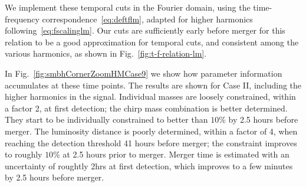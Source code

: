 \documentclass[aps,showpacs,twocolumn,prd,superscriptaddress,nofootinbib]{revtex4-1}
\newcommand{\SM}[1]{{\color{Blue} [SM: #1]}}
\begin{document}

We implement these temporal cuts in the Fourier domain, using the time-frequency correspondence~\eqref{eq:deftflm}, adapted for higher harmonics following~\eqref{eq:fscalinglm}. Our cuts are sufficiently early before merger for this relation to be a good approximation for temporal cuts, and consistent among the various harmonics, as shown in Fig.~\ref{fig:t-f-relation-lm}.

In Fig.~\ref{fig:smbhCornerZoomHMCase9} we show how parameter information accumulates at these time points. The results are shown for Case II, including the higher harmonics in the signal. Individual masses are loosely constrained, within a factor 2, at first detection; the chirp mass combination is better determined. They start to be individually constrained to better than $10\%$ by 2.5 hours before merger. The luminosity distance is poorly determined, within a factor of 4, when reaching the detection threshold 41 hours before merger; the constraint improves to roughly $10\%$ at 2.5 hours prior to merger. Merger time is estimated with an uncertainty of roughtly 2hrs at first detection, which improves to a few minutes by 2.5 hours before merger.
\end{document}

